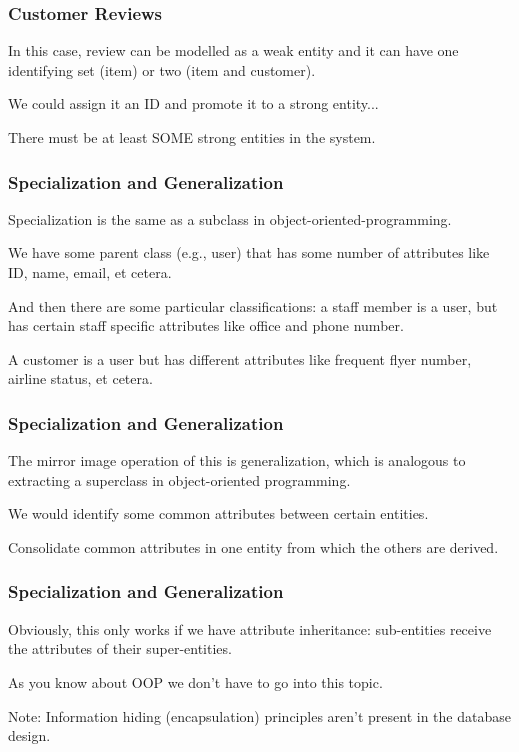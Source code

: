 \begin{frame}
\frametitle{Customer Reviews}

In this case, review can be modelled as a weak entity and it can have one identifying set (item) or two (item and customer).

We could assign it an ID and promote it to a strong entity...

There must be at least SOME strong entities in the system.

\end{frame}



\begin{frame}
\frametitle{Specialization and Generalization}

\alert{Specialization} is the same as a subclass in object-oriented-programming.

 We have some parent class (e.g., user) that has some number of attributes like ID, name, email, et cetera. 
 
 And then there are some particular classifications: a staff member is a user, but has certain staff specific attributes like office and phone number. 
 
 A customer is a user but has different attributes like frequent flyer number, airline status, et cetera. 

\end{frame}




\begin{frame}
\frametitle{Specialization and Generalization}

The mirror image operation of this is generalization, which is analogous to extracting a superclass in object-oriented programming. 

We would identify some common attributes between certain entities. 

Consolidate common attributes in one entity from which the others are derived.

\end{frame}



\begin{frame}
\frametitle{Specialization and Generalization}
Obviously, this only works if we have attribute inheritance: sub-entities receive the attributes of their super-entities. 

As you know about OOP we don't have to go into this topic.


Note: Information hiding (encapsulation) principles aren't present in the database design.


\end{frame}



